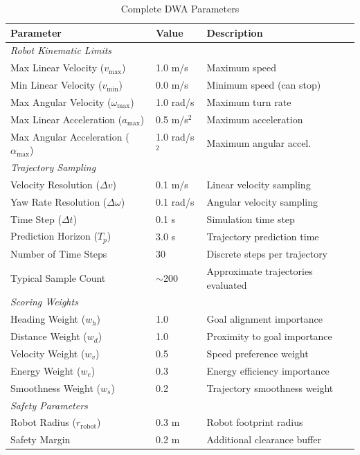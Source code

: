 \begin{table}[htbp]
\centering
\caption{Complete DWA Parameters}
\label{tab:dwa_params}
\begin{tabular}{@{}lll@{}}
\toprule
\textbf{Parameter} & \textbf{Value} & \textbf{Description} \\
\midrule
\multicolumn{3}{l}{\textit{Robot Kinematic Limits}} \\
Max Linear Velocity ($v_{\max}$) & 1.0 m/s & Maximum speed \\
Min Linear Velocity ($v_{\min}$) & 0.0 m/s & Minimum speed (can stop) \\
Max Angular Velocity ($\omega_{\max}$) & 1.0 rad/s & Maximum turn rate \\
Max Linear Acceleration ($a_{\max}$) & 0.5 m/s$^2$ & Maximum acceleration \\
Max Angular Acceleration ($\alpha_{\max}$) & 1.0 rad/s$^2$ & Maximum angular accel. \\
\midrule
\multicolumn{3}{l}{\textit{Trajectory Sampling}} \\
Velocity Resolution ($\Delta v$) & 0.1 m/s & Linear velocity sampling \\
Yaw Rate Resolution ($\Delta \omega$) & 0.1 rad/s & Angular velocity sampling \\
Time Step ($\Delta t$) & 0.1 s & Simulation time step \\
Prediction Horizon ($T_p$) & 3.0 s & Trajectory prediction time \\
Number of Time Steps & 30 & Discrete steps per trajectory \\
Typical Sample Count & $\sim$200 & Approximate trajectories evaluated \\
\midrule
\multicolumn{3}{l}{\textit{Scoring Weights}} \\
Heading Weight ($w_h$) & 1.0 & Goal alignment importance \\
Distance Weight ($w_d$) & 1.0 & Proximity to goal importance \\
Velocity Weight ($w_v$) & 0.5 & Speed preference weight \\
Energy Weight ($w_e$) & 0.3 & Energy efficiency importance \\
Smoothness Weight ($w_s$) & 0.2 & Trajectory smoothness weight \\
\midrule
\multicolumn{3}{l}{\textit{Safety Parameters}} \\
Robot Radius ($r_{\text{robot}}$) & 0.3 m & Robot footprint radius \\
Safety Margin & 0.2 m & Additional clearance buffer \\

\end{tabular}
\end{table}
